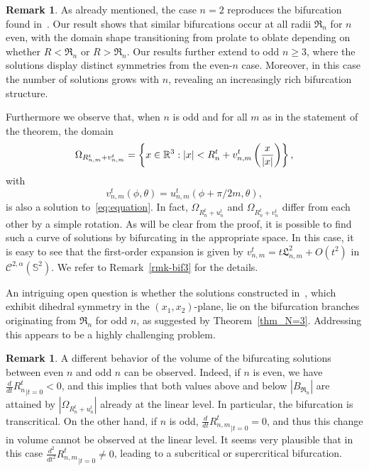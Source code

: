 \documentclass[10pt,reqno,english]{amsart}
\newcommand{\Sd}{\mathbb{S}^2}
\newcommand{\rn}{{\mathfrak R}_n  }
\theoremstyle{definition}
\newtheorem{remark}[lemma]{Remark}
\numberwithin{equation}{section}
\begin{document}
\begin{remark}
As already mentioned, the case $n=2$ reproduces the bifurcation found in~\cite{Fr19}. Our result shows that similar bifurcations occur at all radii $\rn$ for $n$ even, with the domain shape transitioning from prolate to oblate depending on whether $R<\rn$ or $R>\rn$. Our results further extend to odd $n \ge 3$, where the solutions display distinct symmetries from the even-$n$ case. Moreover, in this case the number of solutions grows with $n$, revealing an increasingly rich bifurcation structure.

Furthermore we observe that, when $n$ is odd and for all $m$ as in the statement of the theorem, the domain 
\[
\Omega_{R_{n,m}^t+v_{n,m}^t} = \left\{ x \in \mathbb{R}^3 : |x| < R_n^t + v_{n,m}^t \left( {x \over |x|} \right) \right\},
\]
with
\[
v_{n,m}^t (\phi, \theta) = u_{n,m}^t (\phi+\pi/2m, \theta),
\]
is also a solution to~\eqref{eq:equation}. In fact, $\Omega_{R_n^t+u_n^t}$ and $\Omega_{R_n^t+v_n^t}$ differ from each other by a simple rotation. As will be clear from the proof, it is possible to find such a curve of solutions by bifurcating in the appropriate space. In this case, it is easy to see that the first-order expansion is given by $v_{n,m}^t = t \mathfrak L^2_{n,m} + O(t^2)$ in $\mathcal C^{2,\alpha}(\Sd)$. We refer to Remark~\ref{rmk-bif3} for the details.

An intriguing open question is whether the solutions constructed in~\cite{delPinoMussoZuniga2025}, which exhibit dihedral symmetry in the $(x_1, x_2)$-plane, lie on the bifurcation branches originating from 
$\rn$ for odd $n$, as suggested by Theorem~\ref{thm_N=3}. Addressing this appears to be a highly challenging problem.
\end{remark}

\begin{remark}
A different behavior of the volume of the bifurcating solutions between even $n$ and odd $n$ can be observed. Indeed, if $n$ is even, we have $\frac{d}{dt}{R_n^t}_{|t=0}<0$, and this implies that both values above and below $|B_{\rn}|$ are attained by $|\Omega_{R_n^t+u_n^t}|$ already at the linear level. In particular, the bifurcation is transcritical. On the other hand, if $n$ is odd, $\frac{d}{dt}{R_{n,m}^t}_{|t=0}=0$, and thus this change in volume cannot be observed at the linear level. It seems very plausible that in this case $\frac{d^2}{dt^2}{R_{n,m}^t}_{|t=0}\neq 0$, leading to a subcritical or supercritical bifurcation.
\end{remark}
\end{document}
